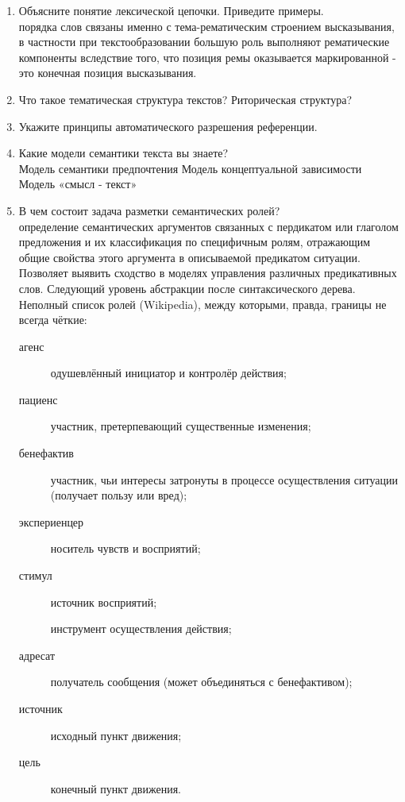 \documentclass[a4paper]{article}
\begin{document}
\begin{enumerate}
	\item Объясните понятие лексической цепочки. Приведите примеры.\hfill\\
	порядка слов связаны именно с тема-рематическим строением высказывания, в частности при текстообразовании большую роль выполняют рематические компоненты вследствие того, что позиция ремы оказывается маркированной - это конечная позиция высказывания.

	\item Что такое тематическая структура текстов? Риторическая структура?\hfill\\
	\item Укажите принципы автоматического разрешения референции.\hfill\\
	\item Какие модели семантики текста вы знаете?\hfill\\
	Модель семантики предпочтения
	Модель концептуальной зависимости
	Модель «смысл - текст»

	\item В чем состоит задача разметки семантических ролей?\hfill\\
	определение семантических аргументов связанных с пердикатом или глаголом предложения и их классификация по специфичным ролям, отражающим общие свойства этого аргумента в описываемой предикатом ситуации. Позволяет выявить сходство в моделях управления различных предикативных слов. Следующий уровень абстракции после синтаксического дерева.	Неполный список ролей (Wikipedia), между которыми, правда, границы не всегда чёткие: \begin{description}
		\item[агенс] одушевлённый инициатор и контролёр действия;
		\item[пациенс] участник, претерпевающий существенные изменения;
		\item[бенефактив] участник, чьи интересы затронуты в процессе осуществления ситуации (получает пользу или вред);
		\item[экспериенцер] носитель чувств и восприятий;
		\item[стимул] источник восприятий;
		\item[] инструмент осуществления действия;
		\item[адресат] получатель сообщения (может объединяться с бенефактивом);
		\item[источник] исходный пункт движения;
		\item[цель] конечный пункт движения.
	\end{description} 


\end{enumerate}
\end{document}
